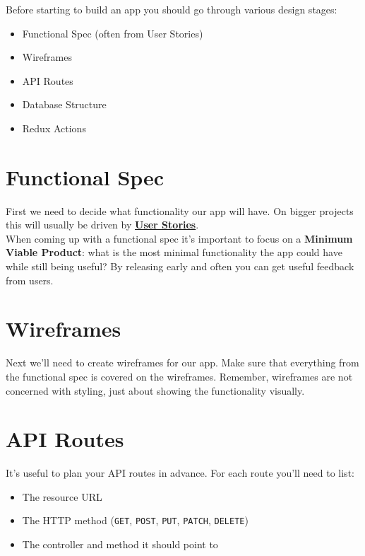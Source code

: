 
Before starting to build an app you should go through various design stages:

\begin{itemize}
    \item Functional Spec (often from User Stories)
    \item Wireframes
    \item API Routes
    \item Database Structure
    \item Redux Actions
\end{itemize}


\section{Functional Spec}

First we need to decide what functionality our app will have. On bigger projects this will usually be driven by \href{https://www.gov.uk/service-manual/agile-delivery/writing-user-stories}{\textbf{User Stories}}.
\\

When coming up with a functional spec it's important to focus on a \textbf{Minimum Viable Product}: what is the most minimal functionality the app could have while still being useful? By releasing early and often you can get useful feedback from users.

\section{Wireframes}

Next we'll need to create wireframes for our app. Make sure that everything from the functional spec is covered on the wireframes. Remember, wireframes are not concerned with styling, just about showing the functionality visually.

\section{API Routes}

It's useful to plan your API routes in advance. For each route you'll need to list:

\begin{itemize}
    \item The resource URL
    \item The HTTP method (\texttt{GET}, \texttt{POST}, \texttt{PUT}, \texttt{PATCH}, \texttt{DELETE})
    \item The controller and method it should point to
\end{itemize}

